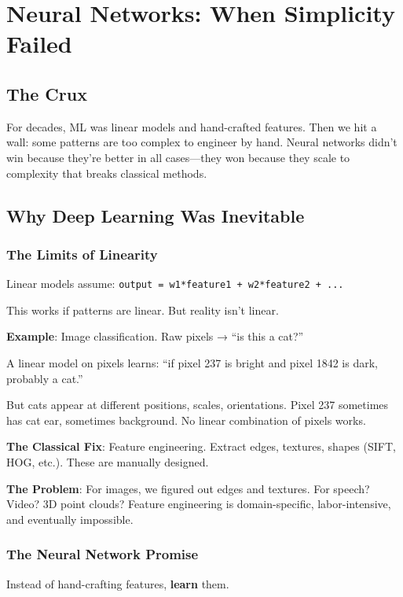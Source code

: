\chapter{Neural Networks: When Simplicity Failed}

\section{The Crux}
For decades, ML was linear models and hand-crafted features. Then we hit a wall: some patterns are too complex to engineer by hand. Neural networks didn't win because they're better in all cases---they won because they scale to complexity that breaks classical methods.

\section{Why Deep Learning Was Inevitable}

\subsection{The Limits of Linearity}

Linear models assume: \texttt{output = w1*feature1 + w2*feature2 + ...}

This works if patterns are linear. But reality isn't linear.

\textbf{Example}: Image classification. Raw pixels → ``is this a cat?''

A linear model on pixels learns: ``if pixel 237 is bright and pixel 1842 is dark, probably a cat.''

But cats appear at different positions, scales, orientations. Pixel 237 sometimes has cat ear, sometimes background. No linear combination of pixels works.

\textbf{The Classical Fix}: Feature engineering. Extract edges, textures, shapes (SIFT, HOG, etc.). These are manually designed.

\textbf{The Problem}: For images, we figured out edges and textures. For speech? Video? 3D point clouds? Feature engineering is domain-specific, labor-intensive, and eventually impossible.

\subsection{The Neural Network Promise}

Instead of hand-crafting features, \textbf{learn} them.

